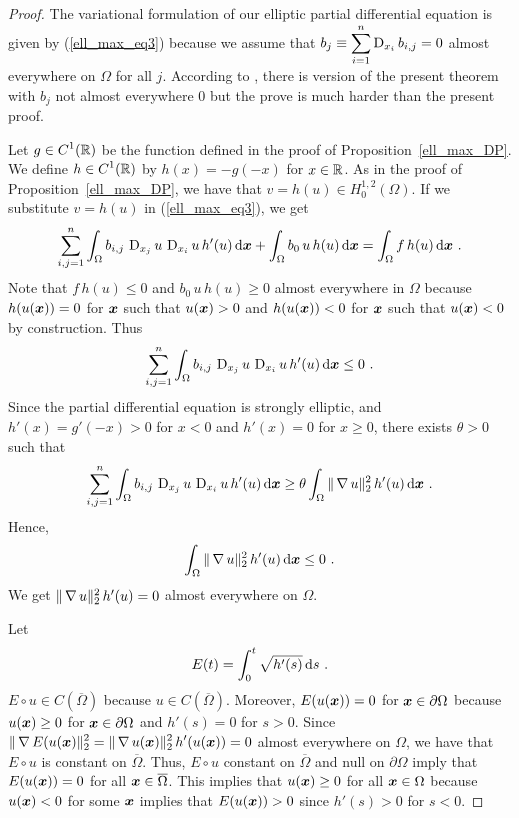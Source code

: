 \begin{proof}
The variational formulation of our elliptic partial differential
equation is given by (\ref{ell_max_eq3}) because we assume that
$\displaystyle b_j \equiv \sum_{i=1}^n \operatorname{D}_{x_i} b_{i,j} = 0$
almost everywhere on $\Omega$ for all $j$.  According to \cite{Br},
there is version of the present theorem with
$b_j$ not almost everywhere $0$ but the prove is much harder
than the present proof.

  Let $\displaystyle g\in C^1(\mathbb{R})$ be the function defined
in the proof of Proposition~\ref{ell_max_DP}.  We define
$\displaystyle h\in C^1(\mathbb{R})$ by $h(x) = -g(-x)$
for $x\in \mathbb{R}$.  As in the proof of Proposition~\ref{ell_max_DP}, we have
that $\displaystyle v=h(u) \in H^{1,2}_0(\Omega)$.  If we substitute
$v=h(u)$ in (\ref{ell_max_eq3}), we get
\[
\sum_{i,j=1}^n
\int_\Omega b_{i,j} \, \operatorname{D}_{x_j} u \, \operatorname{D}_{x_i} u \,
h'(u) \,\mathrm{d}{{\bm{x}}} + \int_\Omega b_0 \, u \, h(u) \,\mathrm{d}{{\bm{x}}} 
= \int_\Omega f\,h(u) \,\mathrm{d}{{\bm{x}}} \ .
\]
Note that $f\,h(u) \leq 0$ and
$b_0 \, u \, h(u)\geq 0$ almost everywhere in $\Omega$ because
$h(u({\bm{x}})) = 0$ for ${\bm{x}}$ such that $u({\bm{x}})>0$ and
$h(u({\bm{x}})) < 0$ for ${\bm{x}}$ such that $u({\bm{x}}) < 0$ by
construction.  Thus
\[
\sum_{i,j=1}^n
\int_\Omega b_{i,j} \, \operatorname{D}_{x_j} u \, \operatorname{D}_{x_i} u \,
h'(u) \,\mathrm{d}{{\bm{x}}} \leq 0 \ .
\]
Since the partial differential equation is strongly elliptic, and
$h'(x) = g'(-x)>0$ for $x<0$ and $h'(x) = 0$ for $x \geq 0$, there
exists $\theta >0$ such that
\[
\sum_{i,j=1}^n
\int_\Omega b_{i,j} \, \operatorname{D}_{x_j} u \, \operatorname{D}_{x_i} u \, h'(u) \,\mathrm{d}{{\bm{x}}}
\geq \theta \int_\Omega \|\operatorname{\nabla} u\|_2^2\, h'(u) \,\mathrm{d}{{\bm{x}}} \  .
\]
Hence,
\[
\int_\Omega \|\operatorname{\nabla} u\|_2^2\, h'(u) \,\mathrm{d}{{\bm{x}}} \leq 0 \ .
\]
We get $\|\operatorname{\nabla} u\|_2^2\, h'(u) =0$ almost everywhere on $\Omega$.

Let
\begin{equation} \label{ell_max_thPr}
E(t) = \int_0^t \sqrt{h'(s)} \,\mathrm{d}{s} \ .
\end{equation}
$E\circ u \in C(\overline{\Omega})$ because $u\in C(\overline{\Omega})$.
Moreover, $E(u({\bm{x}})) = 0$ for ${\bm{x}} \in \partial \Omega$ because
$u({\bm{x}}) \geq 0$ for ${\bm{x}} \in \partial \Omega$ and
$h'(s)=0$ for $s>0$.  Since
$\displaystyle \|\operatorname{\nabla} E(u({\bm{x}})\|_2^2 =
\|\operatorname{\nabla} u({\bm{x}})\|_2^2\, h'(u({\bm{x}})) = 0$ almost everywhere
on $\Omega$, we have that $E\circ u$ is constant on $\overline{\Omega}$.
Thus, $E\circ u$ constant on $\overline{\Omega}$ and null on
$\partial \Omega$ imply that
$E(u({\bm{x}})) =0$ for all ${\bm{x}} \in \overline{\Omega}$.  This implies
that $u({\bm{x}}) \geq 0$ for all ${\bm{x}}\in \Omega$ because
$u({\bm{x}})<0$ for some ${\bm{x}}$ implies that
$E(u({\bm{x}})) >0$ since $h'(s) > 0$ for $s<0$.


\end{proof}
